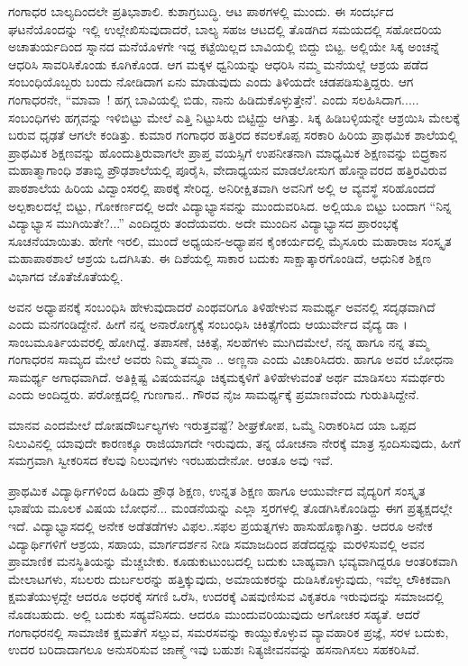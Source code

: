 {ಗಂಗಾಧರ ಬಾಲ್ಯದಿಂದಲೇ ಪ್ರತಿಭಾಶಾಲಿ. ಕುಶಾಗ್ರಬುದ್ಧಿ. ಆಟ \enginline{-} \hbox{ಪಾಠಗಳಲ್ಲಿ} \hbox{ಮುಂದು.}
ಈ ಸಂದರ್ಭದ ಘಟನೆಯೊಂದನ್ನು ಇಲ್ಲಿ ಉಲ್ಲೇಖಿಸುವುದಾದರೆ,
ಬಾಲ್ಯ ಸಹಜ ಆಟದಲ್ಲಿ ತೊಡಗಿದ ಸಮಯದಲ್ಲಿ ಸಹೋದರಿಯ ಅಚಾತುರ್ಯದಿಂದ ಸ್ನಾನದ ಮನೆಯೊಳಗೇ ಇದ್ದ ಕಟ್ಟೆಯಿಲ್ಲದ ಬಾವಿಯಲ್ಲಿ ಬಿದ್ದು ಬಿಟ್ಟ. ಅಲ್ಲಿಯೇ ಸಿಕ್ಕ ಅಂಚನ್ನೆ ಆಧರಿಸಿ ಸಾವರಿಸಿಕೊಂಡು  ಕೂಗಿಕೊಂಡ. ಆಗ ಮಕ್ಕಳ ಧ್ವನಿಯನ್ನು ಆಧರಿಸಿ ನಮ್ಮ ಮನೆಯಲ್ಲೆ ಆಶ್ರಯ ಪಡೆದ \hbox{ಸಂಬಂಧಿ}ಯೊಬ್ಬರು ಬಂದು ನೋಡಿದಾಗ ಏನು ಮಾಡುವುದು ಎಂದು ತಿಳಿಯದೇ ಚಡಪಡಿಸುತ್ತಿದ್ದರು. ಆಗ ಗಂಗಾಧರನೇ, “ಮಾವಾ~! ಹಗ್ಗ ಬಾವಿಯಲ್ಲಿ ಬಿಡು, ನಾನು ಹಿಡಿದುಕೊಳ್ಳುತ್ತೇನೆ’. ಎಂದು ಸಲಹಿಸಿದಾಗ..... ಸಂಬಂಧಿಗಳು ಹಗ್ಗವನ್ನು ಇಳಿಬಿಟ್ಟು ಮೇಲೆ ಎತ್ತಿ ನಿಟ್ಟುಸಿರು ಬಿಟ್ಟಿದ್ದು ಆಗಿತ್ತು. ಸಿಕ್ಕ ಹಿಡಿಬಳ್ಳಿಯನ್ನೇ  ಆಶ್ರಯಿಸಿ ಮೇಲಕ್ಕೆ ಬರುವ ಧೃಢತೆ ಆಗಲೇ ಕಂಡಿತ್ತು.
\vskip 2pt
ಕುಮಾರ ಗಂಗಾಧರ ಹತ್ತಿರದ ಕವಲಕೊಪ್ಪ ಸರಕಾರಿ ಹಿರಿಯ ಪ್ರಾಥಮಿಕ ಶಾಲೆಯಲ್ಲಿ ಪ್ರಾಥಮಿಕ ಶಿಕ್ಷಣವನ್ನು ಹೊಂದುತ್ತಿರುವಾಗಲೇ ಪ್ರಾಪ್ತ ವಯಸ್ಸಿಗೆ ಉಪನೀತನಾಗಿ  ಮಾಧ್ಯಮಿಕ ಶಿಕ್ಷಣವನ್ನು ಬಿದ್ರ್ರಕಾನ ಮಹಾತ್ಮಾಗಾಂಧಿ ಶತಾಬ್ದಿ ಪ್ರೌಢಶಾಲೆಯಲ್ಲಿ ಪೂರೈಸಿ, ವೇದಾಧ್ಯಯನ ಮಾಡಲೋಸುಗ ಹೊನ್ನಾವರದ ಹತ್ತಿರವಿರುವ ಪಾಠಶಾಲೆಯ ಹಿರಿಯ ವಿದ್ವಾಂಸರಲ್ಲಿ ಪಾಠಕ್ಕೆ ಸೇರಿದ್ದ.  ಅನಿರೀಕ್ಷಿತವಾಗಿ ಅವನಿಗೆ ಅಲ್ಲಿ ಆ ವ್ಯವಸ್ಥೆ ಸರಿಹೊಂದದೆ ಅಲ್ಪಕಾಲದಲ್ಲೆ ಬಿಟ್ಟು, ಗೋಕರ್ಣದಲ್ಲಿ ಅದೇ ವಿದ್ಯಾಭ್ಯಾಸವನ್ನು ಮುಂದುವರಿಸಿದ. ಅಲ್ಲಿಯೂ ಬಿಟ್ಟು  ಬಂದಾಗ “ನಿನ್ನ ವಿದ್ಯಾಭ್ಯಾಸ ಮುಗಿಯಿತೇ?...” ಎಂದಿದ್ದರು ತಂದೆಯವರು. ಅದೇ ಮುಂದಿನ ವಿದ್ಯಾಭ್ಯಾಸದ ಪ್ರಾರಂಭಕ್ಕೆ  ಸೂಚನೆಯಾಯಿತು. ಹೇಗೇ ಇರಲಿ, ಮುಂದೆ ಅಧ್ಯಯನ-ಅಧ್ಯಾಪನ ಕೈಂಕರ್ಯದಲ್ಲಿ  ಮೈಸೂರು ಮಹಾರಾಜ ಸಂಸ್ಕೃತ ಮಹಾಪಾಠಶಾಲೆ ಆಶ್ರಯ ಒದಗಿಸಿತು. ಈ ದಿಶೆಯಲ್ಲಿ  ಸಾಕಾರ  ಬದುಕು ಸಾಕ್ಷಾತ್ಕಾರಗೊಂಡಿದೆ, ಆಧುನಿಕ ಶಿಕ್ಷಣ ವಿಭಾಗದ ಜೊತೆಜೊತೆಯಲ್ಲಿ.

ಅವನ ಅಧ್ಯಾಪನಕ್ಕೆ ಸಂಬಂಧಿಸಿ ಹೇಳುವುದಾದರೆ ಎಂಥವರಿಗೂ ತಿಳಿಹೇಳುವ ಸಾಮರ್ಥ್ಯ ಅವನಲ್ಲಿ ಸದೃಢವಾಗಿದೆ ಎಂದು ಮನಗಂಡಿದ್ದೇನೆ.  ಹೀಗೆ ನನ್ನ ಅನಾರೋಗ್ಯಕ್ಕೆ  ಸಂಬಂಧಿಸಿ ಚಿಕಿತ್ಸೆಗೆಂದು ಆಯುರ್ವೇದ ವೈದ್ಯ ಡಾ । ಸಾಂಬಮೂರ್ತಿಯವರಲ್ಲಿ ಹೋಗಿದ್ದೆ. ತಪಾಸಣೆ, ಚಿಕಿತ್ಸೆ, ಸಲಹೆಗಳು ಮುಗಿದಮೇಲೆ, ನನ್ನ ಹಾಗೂ  ನನ್ನ ತಮ್ಮ ಗಂಗಾಧರನ ಸಾಮ್ಯದ ಮೇಲೆ ಅವರು ನಿಮ್ಮ ತಮ್ಮನಾ .. ಅಣ್ಣನಾ ಎಂದು ವಿಚಾರಿಸಿದರು. ಹಾಗೂ ಅವರ ಬೋಧನಾ ಸಾಮರ್ಥ್ಯ ಅಗಾಧವಾಗಿದೆ. ಅತಿಕ್ಲಿಷ್ಟ ವಿಷಯವನ್ನೂ ಚಿಕ್ಕಮಕ್ಕಳಿಗೆ ತಿಳಿಹೇಳುವಂತೆ ಅರ್ಥ ಮಾಡಿಸಲು ಸಮರ್ಥರು ಎಂದು ಅಂದಿದ್ದರು. ಪರೋಕ್ಷದಲ್ಲಿ ಗುಣಗಾನ.. ಗೌರವ ನೈಜ ಸಾಮರ್ಥ್ಯಕ್ಕೆ  ಪ್ರಮಾಣವೆಂದು ಗುರುತಿಸಿದ್ದೇನೆ.
	
ಮಾನವ ಎಂದಮೇಲೆ ದೋಷ\enginline{-}ದೌರ್ಬಲ್ಯಗಳು ಇರುತ್ತವಷ್ಟೆ?  ಶೀಘ್ರಕೋಪ,  ಒಮ್ಮೆ ನಿರಾಕರಿಸಿದ ಯಾ ಒಪ್ಪದ ನಿಲುವಿನಲ್ಲಿ ಯಾವುದೇ ಕಾರಣಕ್ಕೂ ರಾಜಿಯಾಗದೇ ಇರುವುದು,  ತನ್ನ ಯೋಚನಾ ನೇರಕ್ಕೆ ಮಾತ್ರ ಸ್ಪಂದಿಸುವುದು,  ಹೀಗೆ  ಸಮಗ್ರವಾಗಿ ಸ್ವೀಕರಿಸದ ಕೆಲವು ನಿಲುವುಗಳು ಇರಬಹುದೇನೋ. ಆಂತೂ ಅವು ಇವೆ.

ಪ್ರಾಥಮಿಕ ವಿದ್ಯಾರ್ಥಿಗಳಿಂದ ಹಿಡಿದು ಪ್ರೌಢ ಶಿಕ್ಷಣ, ಉನ್ನತ ಶಿಕ್ಷಣ ಹಾಗೂ ಆಯುರ್ವೇದ ವೈದ್ಯರಿಗೆ ಸಂಸ್ಕೃತ ಭಾಷೆಯ ಮೂಲಕ ವಿಷಯ ಬೋಧನೆ... ಮಂಡನೆಯನ್ನು ಎಲ್ಲಾ ಸ್ತರಗಳಲ್ಲಿ ತೊಡಗಿಸಿಕೊಂಡಿದ್ದು ಈಗ ಪ್ರತ್ಯಕ್ಷದಲ್ಲೇ ಇದೆ. ವಿದ್ಯಾಭ್ಯಾಸದಲ್ಲಿ ಅನೇಕ ಅಡೆತಡೆಗಳು ವಿಫಲ..ಸಫಲ ಪ್ರಯತ್ನಗಳು ಹಾಸುಹೊಕ್ಕಾಗಿತ್ತು. ಆದರೂ ಅನೇಕ ವಿದ್ಯಾರ್ಥಿಗಳಿಗೆ ಆಶ್ರಯ, ಸಹಾಯ,  ಮಾರ್ಗದರ್ಶನ ನೀಡಿ ಸಮಾಜದಿಂದ ಪಡೆದದ್ದನ್ನು ಮರಳಿಸುವಲ್ಲಿ ಅವನ ಪ್ರಾಮಾಣಿಕ ಮನಸ್ಥಿತಿಯನ್ನು  ಮೆಚ್ಚಬೇಕು. 
\vskip 2pt	
ಕೂಡುಕುಟುಂಬದಲ್ಲಿ ಬದುಕು ಬಾಹ್ಯವಾಗಿ ಭವ್ಯವಾಗಿದ್ದರೂ ಆಂತರಿಕವಾಗಿ ಮೇಲಾಟಗಳು, ಸಬಲರು ದುರ್ಬಲರನ್ನು ಹತ್ತಿಕ್ಕುವುದು, ಅಮಾಯಕರನ್ನು ದುಡಿಸಿ\break ಕೊಳ್ಳುವುದು, ಇವೆಲ್ಲ ಲೌಕಿಕವಾಗಿ ಕ್ಷಮತೆಯುಳ್ಳದ್ದೇ ಆದರೂ ಅಧರಕ್ಕೆ ಸಗಣಿ ಒರೆಸಿ, ಉದರಕ್ಕೆ ವಿಷವುಣಿಸುವ ವಿಕೃತರೂ ಇರುವುದನ್ನು ಸಮಾಜದಲ್ಲಿ ನೊಡಬಹುದು. ಅಲ್ಲಿ ಬದುಕು ಸಹ್ಯವೆನಿಸದು. ಆದರೂ ಮುಂದುವರಿಯುವುದು ಅಗೋಚರ ಸಹ್ಯತೆ. ಆದರೆ ಗಂಗಾಧರನಲ್ಲಿ ಸಾಮಾಜಿಕ ಕ್ಷಮತೆಗೆ ಸಲ್ಲುವ, ಸಮರಸವನ್ನು ಕಾಯ್ದುಕೊಳ್ಳುವ ವ್ಯಾವಹಾರಿಕ ಪ್ರಜ್ಞೆ, ಸರಳ ಬದುಕು, ಉದರ ಬರಿದಾದಾಗಲೂ ಅನುಸರಿಸುವ ಜಾಣ್ಮೆ ಇವು ಬಹುಶಃ ನಿತ್ಯಜೀವನವನ್ನು ಹಸನಾಗಿಸಲು ಸಹಕರಿಸಿವೆ.

}
